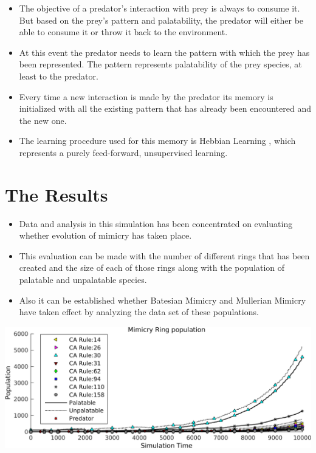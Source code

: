 \documentclass[a0,landscape]{a0poster}
\begin{document}
\begin{multicols}{5}
\begin{itemize}
	\item The objective of a predator's interaction with prey is always to consume it. But based on the prey's pattern and palatability, the predator will either be able to consume it or throw it back to the environment. 
	\item At this event the predator needs to learn the pattern with which the prey has been represented. The pattern represents palatability of the prey species, at least to the predator. 
	\item Every time a new interaction is made by the predator its memory is initialized with all the existing pattern that has already been encountered and the new one.
	\item The learning procedure used for this memory is Hebbian Learning \citep{hebb1949}, which represents a purely feed-forward, unsupervised learning. 
\end{itemize}

\color{DarkSlateGray}
\section*{The Results}

\begin{itemize}
	\item Data and analysis in this simulation has been concentrated on evaluating whether evolution of mimicry has taken place.
	\item This evaluation can be made with the number of different rings that has been created and the size of each of those rings along with the population of palatable and unpalatable species.
	\item Also it can be established whether Batesian Mimicry and Mullerian Mimicry have taken effect by analyzing the data set of these populations.
\end{itemize}

\begin{center}\vspace{1cm}
\includegraphics[width=0.8\linewidth]{simTime10k-2Prey.png}
\label{fig:2prey-species}
\end{center}\vspace{1cm}


\end{multicols}
\end{document}
